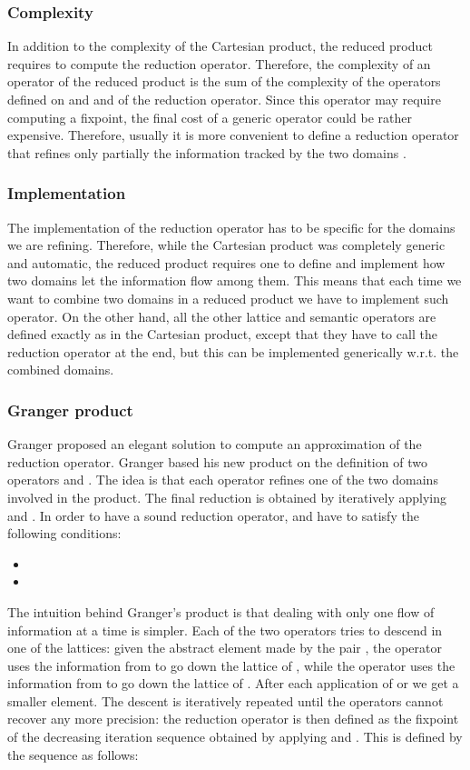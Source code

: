 \documentclass[submission,copyright,creativecommons]{eptcs}
\begin{document}
\subsubsection{Complexity}
In addition to the complexity of the Cartesian product, the reduced product requires to compute the reduction operator. Therefore, the complexity of an operator of the reduced product is the sum of the complexity of the operators defined on  and  and of the reduction operator. Since this operator may require computing a fixpoint, the final cost of a generic operator could be rather expensive. Therefore, usually it is more convenient to define a reduction operator that refines only partially the information tracked by the two domains \cite{LOG08}.


\subsubsection{Implementation}
The implementation of the reduction operator has to be specific for the domains we are refining. Therefore, while the Cartesian product was completely generic and automatic, the reduced product requires one to define and implement how two domains let the information flow among them. This means that each time we want to combine two domains in a reduced product we have to implement such operator. On the other hand, all the other lattice and semantic operators are defined exactly as in the Cartesian product, except that they have to call the reduction operator at the end, but this can be implemented generically w.r.t. the combined domains.

\subsubsection{Granger product}
Granger \cite{G92} proposed an elegant solution to compute an approximation of the reduction operator. Granger based his new product on the definition of two operators  and . The idea is that each operator refines one of the two domains involved in the product. The final reduction is obtained by iteratively applying  and . In order to have a sound reduction operator,  and  have to satisfy the following conditions:
\begin{itemize}
\item 
\item 

\end{itemize}
The intuition behind Granger's product is that dealing with only one flow of information at a time is simpler. Each of the two operators  tries to descend in one of the lattices: given the abstract element made by the pair , the  operator uses the information from  to go down the lattice of 	, while the  operator uses the information from  to go down the lattice of . After each application of  or  we get a smaller element. The descent is iteratively repeated until the operators cannot recover any more precision: the reduction operator  is then defined as the fixpoint of the decreasing iteration sequence obtained by applying  and . This is defined by the sequence  as follows:
\end{document}
